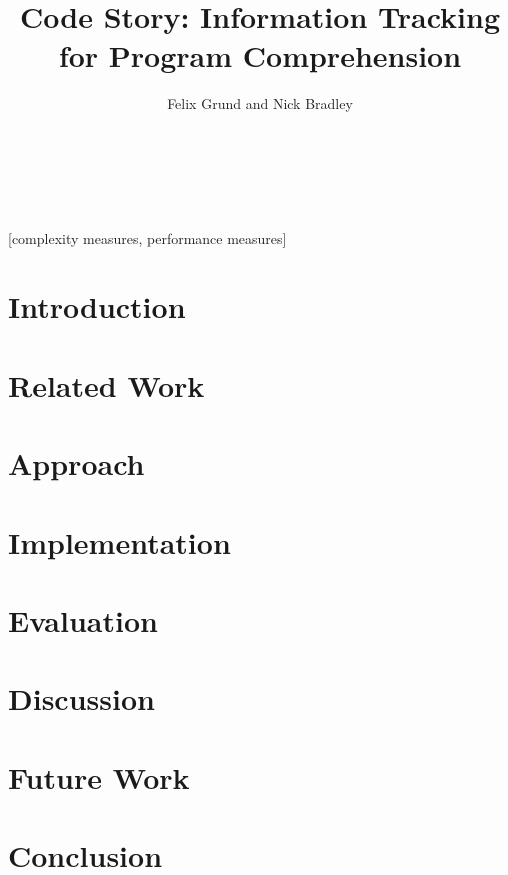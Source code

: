 \documentclass{sig-alternate}
\begin{document}
\title{Code Story: Information Tracking for Program Comprehension}

\author{
\alignauthor
Felix Grund and Nick Bradley \\
       \\
       \\
       \\
}
\maketitle

\begin{abstract}
  
\end{abstract}

[complexity measures, performance measures]



\section{Introduction}
  
\section{Related Work}
  
\section{Approach}
  
\section{Implementation}
  
\section{Evaluation}
  
\section{Discussion}
  
\section{Future Work}
  
\section{Conclusion}
  

  
  
\end{document}

